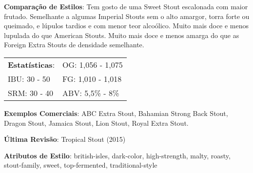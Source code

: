 \textbf{Comparação de Estilos}: Tem gosto de uma Sweet Stout escalonada com maior frutado. Semelhante a algumas Imperial Stouts sem o alto amargor, torra forte ou queimado, e lúpulos tardios e com menor teor alcoólico. Muito mais doce e menos lupulada do que American Stouts. Muito mais doce e menos amarga do que as Foreign Extra Stouts de densidade semelhante.

\begin{tabular}{@{}p{35mm}p{35mm}@{}}
  \textbf{Estatísticas}: & OG: 1,056 - 1,075 \\
  IBU: 30 - 50  & FG: 1,010 - 1,018  \\
  SRM: 30 - 40  & ABV: 5,5\% - 8\%
\end{tabular}

\textbf{Exemplos Comerciais}: ABC Extra Stout, Bahamian Strong Back Stout, Dragon Stout, Jamaica Stout, Lion Stout, Royal Extra Stout.

\textbf{Última Revisão}: Tropical Stout (2015)

\textbf{Atributos de Estilo}: british-isles, dark-color, high-strength, malty, roasty, stout-family, sweet, top-fermented, traditional-style

